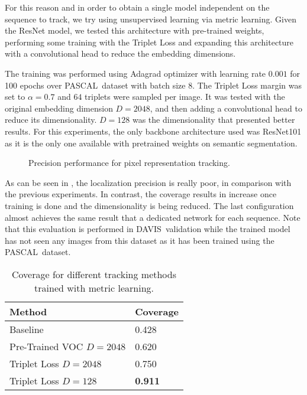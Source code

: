 For this reason and in order to obtain a single model independent on the sequence to track, we try using unsupervised learning  via metric learning.
Given the ResNet model, we tested this architecture with pre-trained weights, performing some training with the Triplet Loss and expanding this architecture with a convolutional head to reduce the embedding dimensions.

The training was performed using Adagrad optimizer with learning rate $0.001$ for 100 epochs over PASCAL~\pascal dataset with batch size $8$.
The Triplet Loss margin was set to $\alpha = 0.7$ and $64$ triplets were sampled per image.
It was tested with the original embedding dimension $D=2048$, and then adding a convolutional head to reduce its dimensionality.
$D=128$ was the dimensionality that presented better results.
For this experiments, the only backbone architecture used was ResNet101 as it is the only one available with pretrained weights on semantic segmentation.


\begin{figure}[h]
  \centering
  
  \caption{Precision performance for pixel representation tracking.}
  \label{fig:tracking_metric_learning}
\end{figure}

As can be seen in , the localization precision is really poor, in comparison with the previous experiments.
In contrast, the coverage results in  increase once training is done and the dimensionality is being reduced. The last configuration almost achieves the same result that a dedicated network for each sequence.
Note that this evaluation is performed in DAVIS~\davislast validation while the trained model has not seen any images from this dataset as it has been trained using the PASCAL~\pascal dataset.


\begin{table}[h]
  \centering
  \begin{tabular}{l|l}
    \toprule
    Method                   & Coverage       \\
    \midrule
    Baseline                 & 0.428          \\
    Pre-Trained VOC $D=2048$ & 0.620          \\
    Triplet Loss $D=2048$    & 0.750          \\
    Triplet Loss $D=128$     & \textbf{0.911} \\
    \bottomrule
  \end{tabular}
  \caption{Coverage for different tracking methods trained with metric learning. }
  \label{tab:coverage_tracking_metric_learning}
\end{table}

